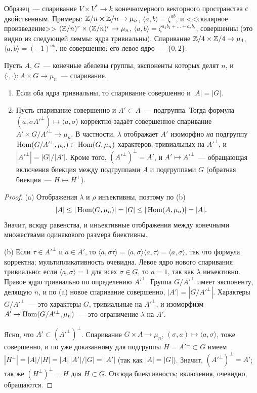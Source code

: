 Образец~--- спаривание $V\times V^*\to k$ конечномерного векторного пространства с двойственным. Примеры:
$\mathbb Z/n\times\mathbb Z/n\to\mu_n$, $\langle a,b\rangle=\zeta^{ab}$, и <<скалярное произведение>> $(\mathbb Z/n)^r\times(\mathbb Z/n)^r\to\mu_n$,
$\langle a,b\rangle=\zeta^{a_1b_1+\dots+a_rb_r}$, совершенны (это видно из следующей леммы: ядра тривиальны). Спаривание
$\mathbb Z/4\times\mathbb Z/4\to\mu_4$, $\langle a,b\rangle=(-1)^{ab}$, не совершенно: его левое ядро~--- $\{0,2\}$.

\begin{lemma}[5.30c]
Пусть $A$, $G$~--- конечные абелевы группы, экспоненты которых делят $n$, и $\langle\cdot,\cdot\rangle\colon A\times
G\to\mu_n$~--- спаривание.
\begin{enumerate}[label=\textup{(\alph*)}]
\item Если оба ядра тривиальны, то спаривание совершенно и $|A|=|G|$.
\item Пусть спаривание совершенно и $A'\subset A$~--- подгруппа. Тогда формула $(a,\sigma A'^\perp)\mapsto\langle
a,\sigma\rangle$ корректно задаёт совершенное спаривание $A'\times G/A'^\perp\to\mu_n$. В частности, $\lambda$
отображает $A'$ изоморфно \emph{на} подгруппу $\operatorname{Hom}(G/A'^\perp,\mu_n)\subset\operatorname{Hom}(G,\mu_n)$ характеров, тривиальных на
$A'^\perp$, и $|A'^\perp|=|G|/|A'|$. Кроме того, $(A'^\perp)^\perp=A'$, и $A'\mapsto A'^\perp$~--- обращающая
включения биекция между подгруппами $A$ и подгруппами $G$ \textup(обратная биекция~--- $H\mapsto H^\perp$\textup).
\end{enumerate}
\end{lemma}

\begin{proof}
(a) Отображения $\lambda$ и $\rho$ инъективны, поэтому по (b)
\[
|A|\le|\operatorname{Hom}(G,\mu_n)|=|G|\le|\operatorname{Hom}(A,\mu_n)|=|A|.
\]
Значит, всюду равенства, и инъективные отображения между конечными множествами одинакового размера биективны.

(b) Если $\tau\in A'^\perp$ и $a\in A'$, то $\langle a,\sigma\tau\rangle=\langle a,\sigma\rangle\langle a,\tau\rangle=
\langle a,\sigma\rangle$, так что формула корректна; мультипликативность очевидна. Левое ядро нового спаривания
тривиально: если $\langle a,\sigma\rangle=1$ для всех $\sigma\in G$, то $a=1$, так как $\lambda$ инъективно. Правое ядро
тривиально по определению $A'^\perp$. Группа $G/A'^\perp$ имеет экспоненту, делящую $n$, и по (a) новое спаривание
совершенно, $|A'|=|G/A'^\perp|$. Характеры $G/A'^\perp$~--- это характеры $G$, тривиальные на $A'^\perp$, и
изоморфизм $A'\to\operatorname{Hom}(G/A'^\perp,\mu_n)$~--- это ограничение $\lambda$ на $A'$.

Ясно, что $A'\subset(A'^\perp)^\perp$. Спаривание $G\times A\to\mu_n$, $(\sigma,a)\mapsto\langle a,\sigma\rangle$, тоже
совершенно, и по уже доказанному для подгруппы $H=A'^\perp\subset G$ имеем $|H^\perp|=|A|/|H|=|A|\,|A'|/|G|=|A'|$ (так как
$|A|=|G|$). Значит, $(A'^\perp)^\perp=A'$; так же $(H^\perp)^\perp=H$ для $H\subset G$. Отсюда биективность;
включения, очевидно, обращаются.
\end{proof}

